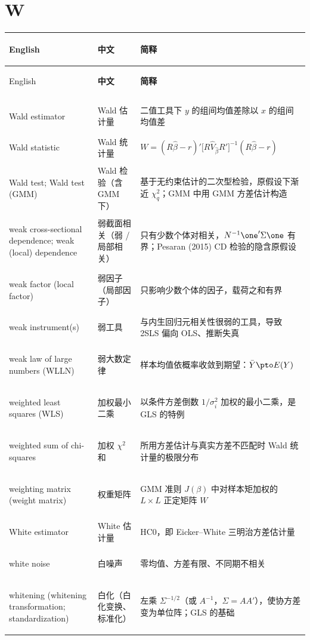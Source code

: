\section*{W}
\begin{longtable}{@{}>{\bfseries\boldmath\raggedright\arraybackslash}p{4.6cm}>{\raggedright\arraybackslash}p{3.2cm}>{\raggedright\arraybackslash}p{\dimexpr\textwidth-7.8cm-4\tabcolsep\relax}@{}}
\toprule
English & \textbf{中文} & \textbf{简释}\\
\midrule
\endfirsthead
\toprule
English & \textbf{中文} & \textbf{简释}\\
\midrule
\endhead
\midrule
\multicolumn{3}{r@{}}{\footnotesize\itshape （续下页）}\\
\endfoot
\bottomrule
\endlastfoot
Wald estimator & Wald 估计量 & 二值工具下 $y$ 的组间均值差除以 $x$ 的组间均值差 \\
Wald statistic & Wald 统计量 & $W=(R\hat\beta-r)'\big[R\hat V_{\hat\beta}R'\big]^{-1}(R\hat\beta-r)$ \\
Wald test; Wald test (GMM) & Wald 检验（含 GMM 下） & 基于无约束估计的二次型检验，原假设下渐近 $\chi^2_q$；GMM 中用 GMM 方差估计构造 \\
weak cross-sectional dependence; weak (local) dependence & 弱截面相关（弱 / 局部相关） & 只有少数个体对相关，$N^{-1}\one'\Sigma\one$ 有界；Pesaran (2015) CD 检验的隐含原假设 \\
weak factor (local factor) & 弱因子（局部因子） & 只影响少数个体的因子，载荷之和有界 \\
weak instrument(s) & 弱工具 & 与内生回归元相关性很弱的工具，导致 2SLS 偏向 OLS、推断失真 \\
weak law of large numbers (WLLN) & 弱大数定律 & 样本均值依概率收敛到期望：$\bar Y\pto E(Y)$ \\
weighted least squares (WLS) & 加权最小二乘 & 以条件方差倒数 $1/\sigma_i^2$ 加权的最小二乘，是 GLS 的特例 \\
weighted sum of chi-squares & 加权 $\chi^2$ 和 & 所用方差估计与真实方差不匹配时 Wald 统计量的极限分布 \\
weighting matrix (weight matrix) & 权重矩阵 & GMM 准则 $J(\beta)$ 中对样本矩加权的 $L\times L$ 正定矩阵 $W$ \\
White estimator & White 估计量 & HC0，即 Eicker--White 三明治方差估计量 \\
white noise & 白噪声 & 零均值、方差有限、不同期不相关 \\
whitening (whitening transformation; standardization) & 白化（白化变换、标准化） & 左乘 $\Sigma^{-1/2}$（或 $A^{-1}$，$\Sigma=AA'$），使协方差变为单位阵；GLS 的基础 \\

\end{longtable}
